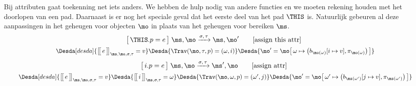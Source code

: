Bij attributen gaat toekenning net iets anders. We hebben de hulp nodig van andere functies en we moeten rekening houden met het doorlopen van een pad. Daarnaast is er nog het speciale geval dat het eerste deel van het pad $\THIS$ is. Natuurlijk gebeuren al deze aanpassingen in het geheugen voor objecten $\mo$ in plaats van het geheugen voor bereiken $\ms$.
%
\begin{gather*}
  \Terminates{\THIS.p = e}
    {\ms, \mo}
    {\sigma, \tau}
    {\ms, \mo'}
  \tag*{[assign this attr]} \\
  \Desdas{
    \Desda[desda]{\Express{e}{\ms, \mo, \sigma, \tau} = v}
    \Desda{\Trav(\mo, \tau, p) = (\omega, i)}
    \Desda{\mo'= \mo \surr{ \omega \mapsto \big(b_{\mo(\omega)}[ i \mapsto v ], \pi_{\mo(\omega)}\big) }}
  }
\end{gather*}
%
\begin{gather*}
  \Terminates{i.p = e}
    {\ms, \mo}
    {\sigma, \tau}
    {\ms', \mo}
  \tag*{[assign attr]} \\
  \Desdas{
    \Desda[desda]{\Express{e}{\ms, \mo, \sigma, \tau} = v}
    \Desda{\Express{i}{\ms,\sigma,\tau} = \omega}
    \Desda{\Trav(\mo, \omega, p) = (\omega', j)}
    \Desda{\mo'= \mo \surr{ \omega' \mapsto \big(b_{\ms(\omega')}[ j \mapsto v ], \pi_{\ms(\omega')}\big) }}
  }
\end{gather*}

